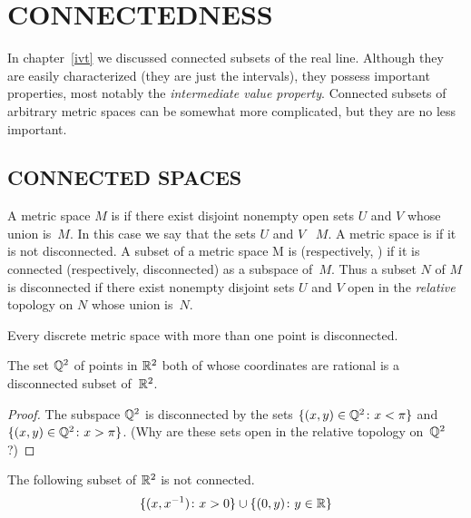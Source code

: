 \chapter{CONNECTEDNESS}\label{conn}
In chapter~\ref{ivt} we discussed connected subsets of the real line.  Although they are
easily characterized (they are just the intervals), they possess important properties, most
notably the \emph{intermediate value property}.  Connected subsets of arbitrary metric spaces
can be somewhat more complicated, but they are no less important.






\section{CONNECTED SPACES}
\begin{defn}\label{def_conn} A metric space $M$ is
 if there exist disjoint nonempty open sets $U$ and $V$ whose union is~$M$.
In this case we say that the sets $U$ and $V$ ~$M$.  A metric space is
 if it is not disconnected.  A subset of a metric space M is
 (respectively,
) if it is connected (respectively, disconnected) as a subspace of~$M$.  Thus
a subset $N$ of $M$ is disconnected if there exist nonempty disjoint sets $U$ and $V$ open in
the \emph{relative} topology on $N$ whose union is~$N$.
\end{defn}

\begin{exam}  Every discrete metric space with more than one point is disconnected.
\end{exam}

\begin{exam} The set $\mathbb{Q}^2$ of points in $\mathbb{R}^2$ both of whose coordinates are rational is a
disconnected subset of~$\mathbb{R}^2$.
\end{exam}

\begin{proof}  The subspace $\mathbb{Q}^2$ is disconnected by the sets $\{(x,y) \in \mathbb{Q}^2 \colon x < \pi\}$
and $\{(x,y) \in \mathbb{Q}^2 \colon x > \pi\}$.  (Why are these sets open in the relative topology
on~$\mathbb{Q}^2$?)
\end{proof}

\begin{exam} The following subset of $\mathbb{R}^2$ is not connected.
  \[ \{(x,x^{-1}) \colon x > 0\} \cup \{(0,y) \colon y \in \mathbb{R}\} \]
\end{exam}

